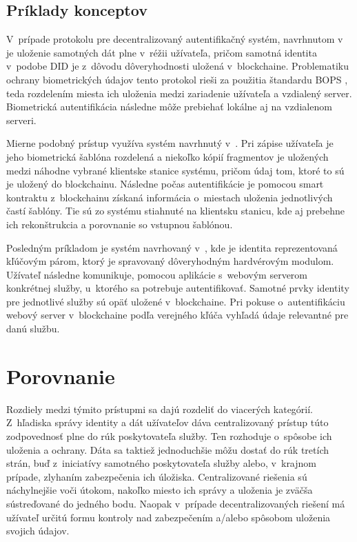 \subsection{Príklady konceptov}
V~prípade protokolu pre decentralizovaný autentifikačný systém, navrhnutom v~\cite{dec_auth1} je uloženie samotných dát plne v~réžii užívateľa, pričom samotná identita v~podobe DID je z~dôvodu dôveryhodnosti uložená v~blockchaine. Problematiku ochrany biometrických údajov tento protokol rieši za použitia štandardu BOPS \cite{ieee_bops}, teda rozdelením miesta ich uloženia medzi zariadenie užívateľa a vzdialený server. Biometrická autentifikácia následne môže prebiehať lokálne aj na vzdialenom serveri.

Mierne podobný prístup využíva systém navrhnutý v~\cite{dec_auth2}. Pri zápise užívateľa je jeho biometrická šablóna rozdelená a niekoľko kópií fragmentov je uložených medzi náhodne vybrané klientske stanice systému, pričom údaj tom, ktoré to sú je uložený do blockchainu. Následne počas autentifikácie je pomocou smart kontraktu z~blockchainu získaná informácia o~miestach uloženia jednotlivých častí šablóny. Tie sú zo systému stiahnuté na klientsku stanicu, kde aj prebehne ich rekonštrukcia a porovnanie so vstupnou šablónou.

Posledným príkladom je systém navrhovaný v~\cite{dec_auth3}, kde je identita reprezentovaná kľúčovým párom, ktorý je spravovaný dôveryhodným hardvérovým modulom. Užívateľ následne komunikuje, pomocou aplikácie s~webovým serverom konkrétnej služby, u~ktorého sa potrebuje autentifikovať. Samotné prvky identity pre jednotlivé služby sú opäť uložené v~blockchaine. Pri pokuse o~autentifikáciu webový server v~blockchaine podľa verejného kľúča vyhľadá údaje relevantné pre danú službu.


\section{Porovnanie}
Rozdiely medzi týmito prístupmi sa dajú rozdeliť do viacerých kategórií. Z~hľadiska správy identity a dát užívateľov dáva centralizovaný prístup túto zodpovednosť plne do rúk poskytovateľa služby. Ten rozhoduje o~spôsobe ich uloženia a ochrany. Dáta sa taktiež jednoduchšie môžu dostať do rúk tretích strán, buď z~iniciatívy samotného poskytovateľa služby alebo, v~krajnom prípade, zlyhaním zabezpečenia ich úložiska. Centralizované riešenia sú náchylnejšie voči útokom, nakoľko miesto ich správy a uloženia je zväčša sústreďované do jedného bodu. Naopak v~prípade decentralizovaných riešení má užívateľ určitú formu kontroly nad zabezpečením a/alebo spôsobom uloženia svojich údajov.

